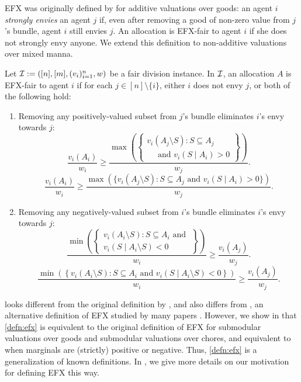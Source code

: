 EFX was originally defined by \citet{caragiannis2019unreasonable} for additive valuations over goods:
an agent $i$ \emph{strongly envies} an agent $j$ if,
even after removing a good of non-zero value from $j$'s bundle, agent $i$ still envies $j$.
An allocation is EFX-fair to agent $i$ if she does not strongly envy anyone.
We extend this definition to non-additive valuations over mixed manna.

\begin{definition}[EFX]
\label{defn:efx}
Let $\mathcal{I} := ([n],\allowbreak [m],\allowbreak (v_i)_{i=1}^n,\allowbreak w)$ be a fair division instance.
In $\mathcal{I}$, an allocation $A$ is EFX-fair to agent $i$ if for each $j \in [n] \setminus \{i\}$,
either $i$ does not envy $j$, or both of the following hold:
\begin{enumerate}
\item Removing any positively-valued subset from $j$'s bundle eliminates $i$'s envy towards $j$:
\ifColsTwo
\[ \frac{v_i(A_i)}{w_i} \ge \frac{\max\left(\left\{
    \begin{array}{l}
    v_i(A_j \setminus S): S \subseteq A_j
    \\\quad \textrm{ and } v_i(S \mid A_i) > 0
    \end{array}\right\}\right)}{w_j}. \]
\else
\[ \frac{v_i(A_i)}{w_i} \ge \frac{\max(\{v_i(A_j \setminus S): S \subseteq A_j
    \textrm{ and } v_i(S \mid A_i) > 0\})}{w_j}. \]
\fi
\item Removing any negatively-valued subset from $i$'s bundle eliminates $i$'s envy towards $j$:
\ifColsTwo
\[ \frac{\min\left(\left\{
    \begin{array}{r}
    v_i(A_i \setminus S): S \subseteq A_i \textrm{ and }
    \\ v_i(S \mid A_i \setminus S) < 0
    \end{array}\right\}\right)}{w_i} \ge \frac{v_i(A_j)}{w_j}. \]
\else
\[ \frac{\min\left(\left\{v_i(A_i \setminus S): S \subseteq A_i
    \textrm{ and } v_i(S \mid A_i \setminus S) < 0 \right\}\right)}{w_i} \ge \frac{v_i(A_j)}{w_j}. \]
\fi
\end{enumerate}
\end{definition}

 looks different from the original definition by \citet{caragiannis2019unreasonable},
and also differs from \EFXZero, an alternative definition of EFX studied by many papers
\citep{plaut2020almost,chaudhury2021little,chaudhury2024efx}.
However, we show in  that \cref{defn:efx} is equivalent to the original definition of EFX
for submodular valuations over goods and submodular valuations over chores,
and equivalent to \EFXZero{} when marginals are (strictly) positive or negative.
Thus, \cref{defn:efx} is a generalization of known definitions.
In , we give more details on our motivation for defining EFX this way.

